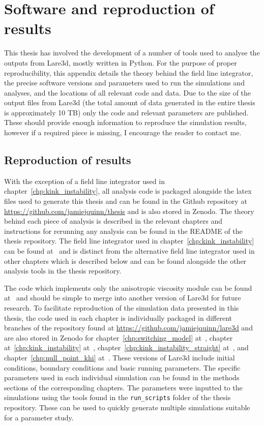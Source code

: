 \chapter{Software and reproduction of results}

This thesis has involved the development of a number of tools used to analyse the outputs from Lare3d, mostly written in Python. For the purpose of proper reproducibility, this appendix details the theory behind the field line integrator, the precise software versions and parameters used to run the simulations and analyses, and the locations of all relevant code and data. Due to the size of the output files from Lare3d (the total amount of data generated in the entire thesis is approximately 10 TB) only the code and relevant parameters are published. These should provide enough information to reproduce the simulation results, however if a required piece is missing, I encourage the reader to contact me.

\section{Reproduction of results}

With the exception of a field line integrator used in chapter~\ref{chp:kink_instability}, all analysis code is packaged alongside the latex files used to generate this thesis and can be found in the Github repository at \url{https://github.com/jamiejquinn/thesis} and is also stored in Zenodo. The theory behind each piece of analysis is described in the relevant chapters and instructions for rerunning any analysis can be found in the README of the thesis repository. The field line integrator used in chapter~\ref{chp:kink_instability} can be found at~\cite{jamie_j_quinn_2019_3560249} and is distinct from the alternative field line integrator used in other chapters which is described below and can be found alongside the other analysis tools in the thesis repository.

The code which implements only the anisotropic viscosity module can be found at~\cite{keith_bennett_2020_4155546} and should be simple to merge into another version of Lare3d for future research. To facilitate reproduction of the simulation data presented in this thesis, the code used in each chapter is individually packaged in different branches of the repository found at \url{https://github.com/jamiejquinn/lare3d} and are also stored in Zenodo for chapter~\ref{chp:switching_model} at~\cite{keith_bennett_2020_4155661}, chapter at~\ref{chp:kink_instability} at~\cite{keith_bennett_2020_4155670}, chapter~\ref{chp:kink_instability_straight} at~\cite{keith_bennett_2020_4155625}, and chapter~\ref{chp:null_point_khi} at~\cite{keith_bennett_2020_4155646}. These versions of Lare3d include initial conditions, boundary conditions and basic running parameters. The specific parameters used in each individual simulation can be found in the methods sections of the corresponding chapters. The parameters were inputted to the simulations using the tools found in the \verb|run_scripts| folder of the thesis repository. These can be used to quickly generate multiple simulations suitable for a parameter study.

